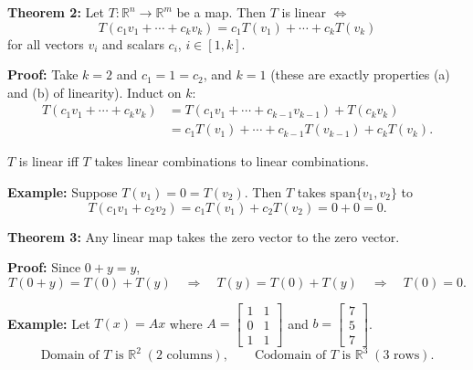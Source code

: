 \documentclass{article}
\begin{document}
\newpage

\textbf{Theorem 2:} Let $T: \mathbb{R}^n \to \mathbb{R}^m$ be a map. Then $T$ is linear $\iff$
\[
T(c_1 v_1 + \cdots + c_k v_k) = c_1 T(v_1) + \cdots + c_k T(v_k)
\]
for all vectors $v_i$ and scalars $c_i$, $i \in [1,k]$.

\medskip

\textbf{Proof:} Take $k=2$ and $c_1 = 1 = c_2$, and $k=1$ (these are exactly properties (a) and (b) of linearity). Induct on $k$:
\begin{align*}
T(c_1 v_1 + \cdots + c_k v_k) &= T(c_1 v_1 + \cdots + c_{k-1} v_{k-1}) + T(c_k v_k) \\
&= c_1 T(v_1) + \cdots + c_{k-1} T(v_{k-1}) + c_k T(v_k).
\end{align*}

\medskip

$T$ is linear iff $T$ takes linear combinations to linear combinations.

\bigskip

\textbf{Example:} Suppose $T(v_1) = 0 = T(v_2)$. Then $T$ takes $\mathrm{span}\{v_1, v_2\}$ to
\[
T(c_1 v_1 + c_2 v_2) = c_1 T(v_1) + c_2 T(v_2) = 0 + 0 = 0.
\]

\newpage

\textbf{Theorem 3:} Any linear map takes the zero vector to the zero vector.

\medskip

\textbf{Proof:} Since $0 + y = y$,
\[
T(0+y) = T(0) + T(y) \quad \Rightarrow \quad T(y) = T(0) + T(y) \quad \Rightarrow \quad T(0) = 0.
\]

\bigskip

\textbf{Example:} Let $T(x) = Ax$ where $A = \begin{bmatrix} 1 & 1 \\ 0 & 1 \\ 1 & 1 \end{bmatrix}$ and $b = \begin{bmatrix} 7 \\ 5 \\ 7 \end{bmatrix}$.
\[
\text{Domain of } T \text{ is } \mathbb{R}^2 \; (2 \text{ columns}), \qquad \text{Codomain of } T \text{ is } \mathbb{R}^3 \; (3 \text{ rows}).
\]

\medskip
\end{document}
